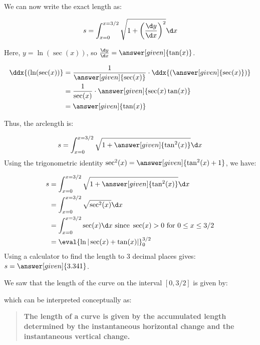 \documentclass{ximera}
\begin{document}
We can now write the exact length as:

\[
s = \int_{x=0}^{x=3/2} \sqrt{1+\left( \frac{\d y}{\d x} \right)^2} \d x
\]
 
 Here, $y= \ln( \sec(x) )$, so $ \frac{\d y}{\d x} = \answer[given]{\tan(x)}$.
 
 \begin{hint}
 \begin{align*}
 \ddx{( \ln( \sec(x) )} &= \frac{1}{\answer[given]{ \sec(x) }} \cdot \ddx{\left(\answer[given]{ \sec(x)}\right)}\\ 
 &= \frac{1}{ \sec(x) } \cdot \answer[given]{ \sec(x)\tan(x)}\\ 
 &= \answer[given]{\tan(x)}
 \end{align*}
 \end{hint}
 
 Thus, the arclength is:
 
 \[
s = \int_{x=0}^{x=3/2} \sqrt{1+\answer[given]{\tan^2(x)}} \d x
\]
Using the trigonometric identity $\sec^2(x) = \answer[given]{\tan^2(x)+1}$, we have:

\begin{align*}
s &= \int_{x=0}^{x=3/2} \sqrt{1+\answer[given]{\tan^2(x)}} \d x\\
&= \int_{x=0}^{x=3/2} \sqrt{\sec^2(x)} \d x \\
& = \int_{x=0}^{x=3/2} \sec(x) \d x \textrm{ since } \sec(x) > 0 \textrm{ for } 0\leq x\leq 3/2 \\
&= \eval{\ln|\sec(x) + \tan(x)|}_0^{3/2}  
\end{align*}
Using a calculator to find the length to 3 decimal places gives: $s = \answer[given]{3.341}$.

\begin{remark}
We saw that the length of the curve on the interval $[0,3/2]$ is given by:
\begin{image}
\end{image}
which can be interpreted conceptually as:
\begin{quote}
  \textbf{The length of a curve is given by the
    \textcolor{green!70!black!70!blue}{accumulated}
    \textcolor{purple!50!blue!90!black}{length determined by the
      instantaneous horizontal change and the instantaneous vertical
      change}.}
\end{quote}
\end{remark}
\end{document}
